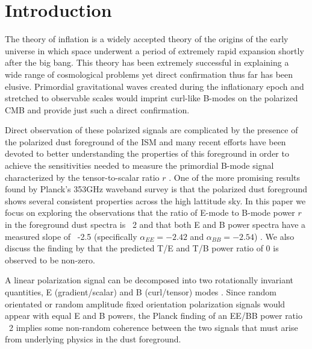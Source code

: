 \section{Introduction}
The theory of inflation is a widely accepted theory of the origins of the early
universe in which space underwent a period of extremely rapid expansion
shortly after the big bang. This theory has been extremely successful in
explaining a wide range of cosmological problems yet direct confirmation thus
far has been elusive. Primordial gravitational waves created during the
inflationary epoch \citep{Starobinskii79, Kamionkowski15} and stretched to observable scales would imprint curl-like
B-modes on the polarized CMB \citep{Guth81, Linde82} and provide just such a direct confirmation.

Direct observation of these polarized signals are complicated by the presence of
the polarized dust foreground of the ISM and many recent efforts
\citep{Kritsuk17, Bracco19} have been
devoted to better understanding the properties of this foreground in order to
achieve the sensitivities needed to measure the primordial B-mode signal
characterized by the tensor-to-scalar ratio $r$ \citep{Baumann09, Planck15}. One
of the more promising results found by Planck's 353GHz waveband survey \citep{Planck15, Planck18XI} is that
the polarized dust foreground shows several consistent properties across the
high lattitude sky. In this paper we focus on exploring the observations that the ratio of
E-mode to B-mode power $r$ in the foreground dust spectra is ~2
\citep{Caldwell16, Planck18XI} and that both E and
B power spectra have a measured slope of ~-2.5 (specifically $\alpha_{EE}=-2.42$ and
$\alpha_{BB}=-2.54$) \citep{Planck15, Planck18XI}. We also
discuss the finding by \citep{Planck18XI} that the predicted T/E and T/B power
ratio of 0 is observed to be non-zero.

A linear polarization signal can be decomposed into two rotationally invariant
quantities, E (gradient/scalar) and B (curl/tensor) modes \citep{Kamionkowski97,
Zaldarriaga97}. Since random orientated or random amplitude fixed orientation
polarization signals would appear with equal E and B powers, the Planck finding
of an EE/BB power ratio ~2 implies some non-random coherence between the two signals
that must arise from underlying physics in the dust foreground.

